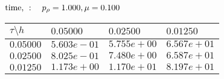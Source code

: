 $
 \text{time, }: \quad p_{\rho}=1.000, \mu = 0.100 \\ $
\begin{tabular}{|p{0.6in}|p{1.2in}|p{1.2in}|p{1.2in}|} \hline
$\tau\setminus h$ & $0.05000$ & $0.02500$& $0.01250$ \\ \hline
$0.05000$ & $5.603e-01$ &$5.755e+00$ &$6.567e+01$  \\ \hline
$0.02500$ & $8.025e-01$ &$7.480e+00$ &$6.587e+01$  \\ \hline
$0.01250$ & $1.173e+00$ &$1.170e+01$ &$8.197e+01$  \\ \hline
\end{tabular}\\[20pt]
